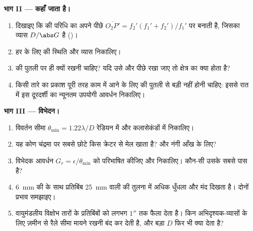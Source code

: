 \begin{problem}
\medskip
\noindent\textbf{भाग II ---  कहाँ जाता है।}
\begin{enumerate}[resume]
  \item दिखाइए कि   की परिधि का  अपने
        पीछे $\overline{O_2P'} = f_2'(f_1' + f_2')/f_1'$ पर बनाती है, जिसका
        व्यास $D/\abs G$ है ()।
  \item हर  के लिए  की स्थिति और व्यास निकालिए।
  \item {} की पुतली  पर ही क्यों रखनी चाहिए? यदि उसे और
        पीछे रखा जाए तो क्षेत्र का क्या होता है?
  \item किसी तारे का प्रकाश पूरी तरह काम में आने के लिए  
        की पुतली से बड़ी नहीं होनी चाहिए: इससे रात में इस दूरदर्शी का
        न्यूनतम उपयोगी आवर्धन निकालिए।
\end{enumerate}

\medskip
\noindent\textbf{भाग III --- विभेदन।}
\begin{enumerate}[resume]
  \item विवर्तन सीमा $\theta_{\min} = 1.22\lambda/D$ रेडियन में और
        कलासेकंडों में निकालिए।
  \item यह कोण चंद्रमा पर सबसे छोटे किस क्रेटर से मेल खाता है? और नंगी
        आँख के लिए?
  \item विभेदक आवर्धन $G_r =
        \epsilon/\theta_{\min}$ को परिभाषित कीजिए और निकालिए। कौन-सी
         उसके सबसे पास है?
  \item \qty{6}{mm} की  के साथ प्रतिबिंब \qty{25}{mm} वाली की
        तुलना में अधिक धुँधला और मंद दिखता है। दोनों प्रभाव समझाइए।
  \item वायुमंडलीय विक्षोभ तारों के प्रतिबिंबों को लगभग $1''$ तक फैला देता
        है। किन अभिदृश्यक-व्यासों के लिए ज़मीन से रैले सीमा मायने रखनी बंद
        कर देती है, और बड़ा $D$ फिर भी क्या देता है?
\end{enumerate}


\end{problem}

